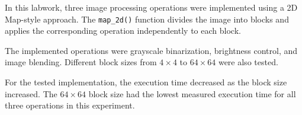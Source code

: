 \documentclass[11pt]{article}
\begin{document}
In this labwork, three image processing operations were implemented using a 2D Map-style approach. The \texttt{map\_2d()} function divides the image into blocks and applies the corresponding operation independently to each block.

The implemented operations were grayscale binarization, brightness control, and image blending. Different block sizes from $4\times4$ to $64\times64$ were also tested.

For the tested implementation, the execution time decreased as the block size increased. The $64\times64$ block size had the lowest measured execution time for all three operations in this experiment.
\end{document}
